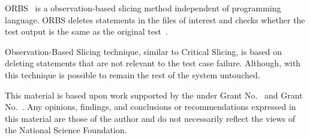 \documentclass[sigplan,10pt,review,anonymous]{acmart}\settopmatter{printfolios=true,printccs=false,printacmref=false}
\begin{document}
ORBS~\cite{Binkley:2014:OLP:2635868.2635893} is a observation-based
slicing method independent of programming language. ORBS deletes
statements in the files of interest and checks whether the test output is
the same as the original
test~\cite{Binkley:2014:OLP:2635868.2635893}.

Observation-Based Slicing technique, similar to Critical Slicing, is
based on deleting statements that are not relevant to the test case
failure. Although, with this technique is possible to remain the rest
of the system untouched.

\begin{acks}                            %

  This material is based upon work supported by the
   under Grant
  No.~ and Grant
  No.~.  Any opinions, findings, and
  conclusions or recommendations expressed in this material are those
  of the author and do not necessarily reflect the views of the
  National Science Foundation.
\end{acks}



\end{document}
